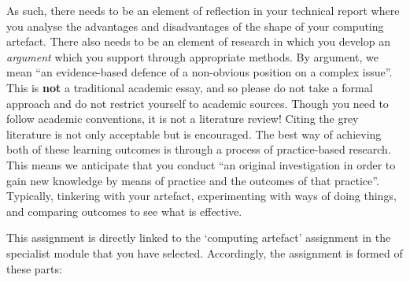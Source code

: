 \documentclass{../../fal_assignment}
\begin{document}
As such, there needs to be an element of reflection in your technical report where you analyse the advantages and disadvantages of the shape of 
your computing artefact. There also needs to be an element of research in which you develop an \textit{argument} which you support through appropriate methods. By argument,
we mean ``an evidence-based defence of a non-obvious position on a complex issue''. This is \textbf{not} a traditional academic essay, and so please do not take a formal approach and do not restrict yourself to academic sources. Though you need to follow academic conventions, it is not a literature review! Citing the grey literature is not only acceptable but is encouraged. The best way of achieving both of these learning outcomes is through a process of practice-based research. This means we anticipate that you conduct ``an original investigation in order to gain new knowledge by means of practice and the outcomes of that practice''. Typically, tinkering with your artefact, experimenting with ways of doing things, and comparing outcomes to see what is effective.

This assignment is directly linked to the `computing artefact' assignment in the specialist module that you have selected. Accordingly, the assignment is formed of these parts:
\end{document}
